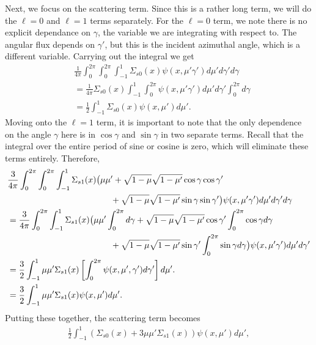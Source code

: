 Next, we focus on the scattering term. Since this is a rather long term, we will do the $\ell = 0$ and $\ell = 1$ terms separately. For the $\ell = 0$ term, we note there is no explicit dependance on $\gamma$, the variable we are integrating with respect to. The angular flux depends on $\gamma'$, but this is the incident azimuthal angle, which is a different variable. Carrying out the integral we get
\begin{align}
   &\frac{1}{4\pi} \int_0^{2\pi} \int_0^{2\pi} \int_{-1}^1 \Sigma_{s0}(x) \psi(x,\mu'\gamma') d\mu' d\gamma' d\gamma \nonumber \\
   &= \frac{1}{4\pi} \Sigma_{s0}(x) \int_{-1}^1  \int_0^{2\pi}  \psi(x,\mu'\gamma') d\mu' d\gamma' \int_0^{2\pi} d\gamma \nonumber \\
   &= \frac{1}{2} \int_{-1}^1 \Sigma_{s0}(x)  \psi(x,\mu') d\mu' . \nonumber
\end{align}
Moving onto the $\ell = 1$ term, it is important to note that the only dependence on the angle $\gamma$ here is in $\cos\gamma$ and $\sin\gamma$ in two separate terms. Recall that the integral over the entire period of sine or cosine is zero, which will eliminate these terms entirely. Therefore,
\begin{align}
   &\frac{3}{4\pi} \int_0^{2\pi} \int_0^{2\pi} \int_{-1}^1 \Sigma_{s1}(x)  \big( \mu \mu' + \sqrt{ 1 - \mu } \sqrt{ 1 - \mu' } \cos\gamma \cos\gamma' \nonumber \\*
   &\hspace{4.25cm} + \sqrt{ 1 - \mu } \sqrt{ 1 - \mu' } \sin\gamma \sin\gamma' \big)  \psi(x,\mu'\gamma') d\mu' d\gamma' d\gamma \nonumber \\
   &= \frac{3}{4\pi} \int_0^{2\pi} \int_{-1}^1 \Sigma_{s1}(x)  \big( \mu \mu'  \int_0^{2\pi} d\gamma + \sqrt{ 1 - \mu } \sqrt{ 1 - \mu' } \cos\gamma' \int_0^{2\pi} \cos\gamma d\gamma \nonumber \\*
   &\hspace{4.25cm} + \sqrt{ 1 - \mu } \sqrt{ 1 - \mu' } \sin\gamma' \int_0^{2\pi} \sin\gamma d\gamma \big)  \psi(x,\mu'\gamma') d\mu' d\gamma' \nonumber \\
   &= \frac{3}{2} \int_{-1}^1 \mu \mu'  \Sigma_{s1}(x) \left[ \int_0^{2\pi} \psi(x,\mu',\gamma') d\gamma' \right] d\mu' . \nonumber \\
   &= \frac{3}{2} \int_{-1}^1 \mu \mu'  \Sigma_{s1}(x)  \psi(x,\mu') d\mu' . \nonumber
\end{align}
Putting these together, the scattering term becomes
\begin{align}
  \frac{1}{2} \int_{-1}^1 ( \Sigma_{s0}(x) + 3 \mu \mu' \Sigma_{s1}(x) ) \psi(x,\mu') d\mu', \nonumber
\end{align}
